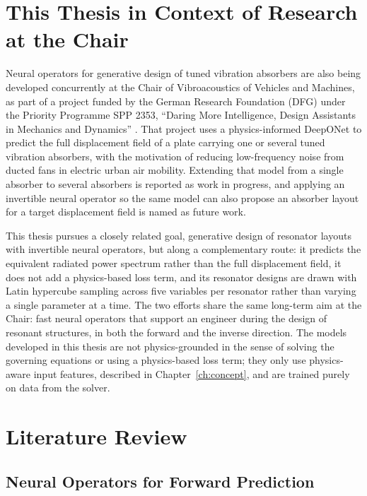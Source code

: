 \section{This Thesis in Context of Research at the Chair}

Neural operators for generative design of tuned vibration absorbers are also being developed concurrently at the Chair of Vibroacoustics of Vehicles and Machines, as part of a project funded by the German Research Foundation (DFG) under the Priority Programme SPP 2353, ``Daring More Intelligence, Design Assistants in Mechanics and Dynamics'' \parencite{dogu2026gamm}. That project uses a physics-informed DeepONet to predict the full displacement field of a plate carrying one or several tuned vibration absorbers, with the motivation of reducing low-frequency noise from ducted fans in electric urban air mobility. Extending that model from a single absorber to several absorbers is reported as work in progress, and applying an invertible neural operator so the same model can also propose an absorber layout for a target displacement field is named as future work.

This thesis pursues a closely related goal, generative design of resonator layouts with invertible neural operators, but along a complementary route: it predicts the equivalent radiated power spectrum rather than the full displacement field, it does not add a physics-based loss term, and its resonator designs are drawn with Latin hypercube sampling across five variables per resonator rather than varying a single parameter at a time. The two efforts share the same long-term aim at the Chair: fast neural operators that support an engineer during the design of resonant structures, in both the forward and the inverse direction. The models developed in this thesis are not physics-grounded in the sense of solving the governing equations or using a physics-based loss term; they only use physics-aware input features, described in Chapter~\ref{ch:concept}, and are trained purely on data from the solver.

\section{Literature Review}

\subsection{Neural Operators for Forward Prediction}

